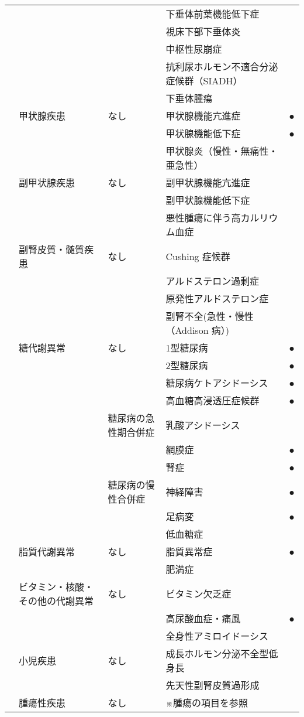\begin{xltabular}{\linewidth}{XXXXX}
 &  &  & 下垂体前葉機能低下症 &  \\
 &  &  & 視床下部下垂体炎 &  \\
 &  &  & 中枢性尿崩症 &  \\
 &  &  & 抗利尿ホルモン不適合分泌症候群（SIADH） &  \\
 &  &  & 下垂体腫瘍 &  \\
 & 甲状腺疾患 & なし & 甲状腺機能亢進症 & ● \\
 &  &  & 甲状腺機能低下症 & ● \\
 &  &  & 甲状腺炎（慢性・無痛性・亜急性） &  \\
 & 副甲状腺疾患 & なし & 副甲状腺機能亢進症 &  \\
 &  &  & 副甲状腺機能低下症 &  \\
 &  &  & 悪性腫瘍に伴う高カルリウム血症 &  \\
 & 副腎皮質・髄質疾患 & なし & Cushing 症候群 &  \\
 &  &  & アルドステロン過剰症 &  \\
 &  &  & 原発性アルドステロン症 &  \\
 &  &  & 副腎不全(急性・慢性（Addison 病）) &  \\
 & 糖代謝異常 & なし & 1型糖尿病 & ● \\
 &  &  & 2型糖尿病 & ● \\
 &  &  & 糖尿病ケトアシドーシス & ● \\
 &  &  & 高血糖高浸透圧症候群 & ● \\
 &  & 糖尿病の急性期合併症 & 乳酸アシドーシス &  \\
 &  &  & 網膜症 & ● \\
 &  &  & 腎症 & ● \\
 &  & 糖尿病の慢性合併症 & 神経障害 & ● \\
 &  &  & 足病変 & ● \\
 &  &  & 低血糖症 &  \\
 & 脂質代謝異常 & なし & 脂質異常症 & ● \\
 &  &  & 肥満症 &  \\
 & ビタミン・核酸・その他の代謝異常 & なし & ビタミン欠乏症 &  \\
 &  &  & 高尿酸血症・痛風 & ● \\
 &  &  & 全身性アミロイドーシス &  \\
 & 小児疾患 & なし & 成長ホルモン分泌不全型低身長 &  \\
 &  &  & 先天性副腎皮質過形成 &  \\
 & 腫瘍性疾患 & なし & ※腫瘍の項目を参照 &  \\

\end{xltabular}
